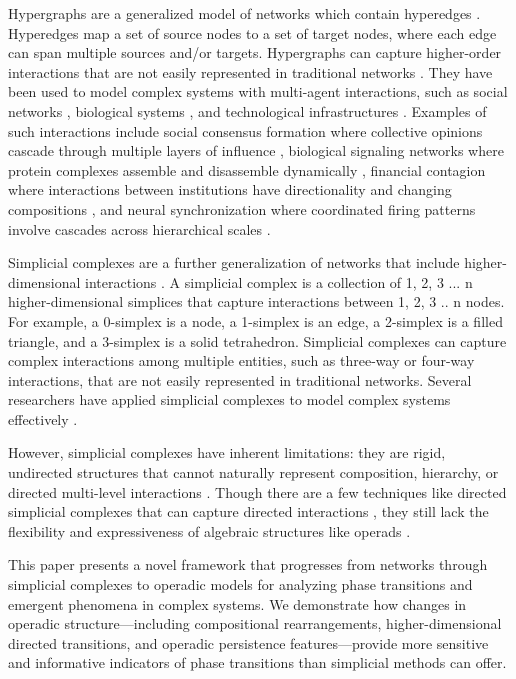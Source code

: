 Hypergraphs are a generalized model of networks which contain hyperedges \citep{berge1984hypergraphs, battiston2020networks}. Hyperedges map a set of source nodes to a set of target nodes, where each edge can span multiple sources and/or targets. Hypergraphs can capture higher-order interactions that are not easily represented in traditional networks \citep{benson2016higher}. They have been used to model complex systems with multi-agent interactions, such as social networks \citep{zhou2007learning}, biological systems \citep{klamt2009hypergraphs}, and technological infrastructures \citep{xu2013hypernetwork}. Examples of such interactions include social consensus formation where collective opinions cascade through multiple layers of influence \citep{neuhäuser2021consensus}, biological signaling networks where protein complexes assemble and disassemble dynamically \citep{ramadan2020hypergraph}, financial contagion where interactions between institutions have directionality and changing compositions \citep{hüser2020financial}, and neural synchronization where coordinated firing patterns involve cascades across hierarchical scales \citep{petri2014homological, giusti2016two, sizemore2018importance}.

Simplicial complexes are a further generalization of networks that include higher-dimensional interactions \citep{petri2014homological, giusti2016two, sizemore2018importance}. A simplicial complex is a collection of 1, 2, 3 ... n higher-dimensional simplices that capture interactions between 1, 2, 3 .. n nodes. For example, a 0-simplex is a node, a 1-simplex is an edge, a 2-simplex is a filled triangle, and a 3-simplex is a solid tetrahedron.  Simplicial complexes can capture complex interactions among multiple entities, such as three-way or four-way interactions, that are not easily represented in traditional networks. Several researchers have applied simplicial complexes to model complex systems effectively \citep{petri2014homological, giusti2016two, sizemore2018importance}.

However, simplicial complexes have inherent limitations: they are rigid, undirected structures that cannot naturally represent composition, hierarchy, or directed multi-level interactions \citep{gong2024higher}. Though there are a few techniques like directed simplicial complexes that can capture directed interactions \citep{masulli2016topology, mukherjee2016random, levi2014directed}, they still lack the flexibility and expressiveness of algebraic structures like operads \citep{baez1997higher, leinster2004higher, kapranov1999operad}.

This paper presents a novel framework that progresses from networks through simplicial complexes to operadic models for analyzing phase transitions and emergent phenomena in complex systems. We demonstrate how changes in operadic structure—including compositional rearrangements, higher-dimensional directed transitions, and operadic persistence features—provide more sensitive and informative indicators of phase transitions than simplicial methods can offer.
